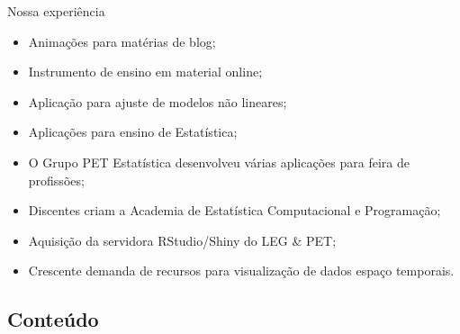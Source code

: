 \begin{frame}

  \begin{block}{Nossa experiência}
    \begin{itemize}
    \item Animações para matérias de blog;
    \item Instrumento de ensino em material online;
    \item Aplicação para ajuste de modelos não lineares;
    \item Aplicações para ensino de Estatística;
    \item O Grupo PET Estatística desenvolveu várias aplicações para
      feira de profissões;
    \item Discentes criam a Academia de Estatística Computacional e Programação;
    \item Aquisição da servidora RStudio/Shiny do LEG \& PET;
    \item Crescente demanda de recursos para visualização de dados espaço
      temporais.
    \end{itemize}
  \end{block}

\end{frame}

\subsection{Conteúdo}

